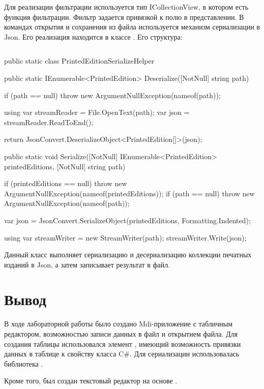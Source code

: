\documentclass[a4paper,14pt]{extarticle}
\begin{document}
Для реализации фильтрации используется тип ICollectionView, в котором есть функция
фильтрации. Фильтр задается привязкой к полю в представлении. В командах открытия
и сохранения из файла используется механизм сериализации в Json. Его реализация находится
в классе . Его структура:

\begin{lstlisting}

\end{lstlisting}
public static class PrintedEditionSerializeHelper
{
    public static IEnumerable<PrintedEdition> Deserialize([NotNull] string path)
    {
        if (path == null) throw new ArgumentNullException(nameof(path));

        using var streamReader = File.OpenText(path);
        var json = streamReader.ReadToEnd();

        return JsonConvert.DeserializeObject<PrintedEdition[]>(json);
    }

    public static void Serialize([NotNull] IEnumerable<PrintedEdition> printedEditions, [NotNull] string path)
    {
        if (printedEditions == null) throw new ArgumentNullException(nameof(printedEditions));
        if (path == null) throw new ArgumentNullException(nameof(path));

        var json = JsonConvert.SerializeObject(printedEditions, Formatting.Indented);

        using var streamWriter = new StreamWriter(path);
        streamWriter.Write(json);
    }
}

Данный класс выполняет сериализацию и десериализацию коллекции печатных изданий в Json,
а затем записывает результат в файл.

\section*{Вывод}
В ходе лабораторной работы было создано Mdi-приложение с табличным редактором, возможностью
записи данных в файл и открытием файла. Для создания таблицы использовался элемент
, имеющий возможность привязки данных в таблице к свойству класса C\#.
Для сериализации использовалась библиотека .

Кроме того, был создан текстовый редактор на основе .
\end{document}
